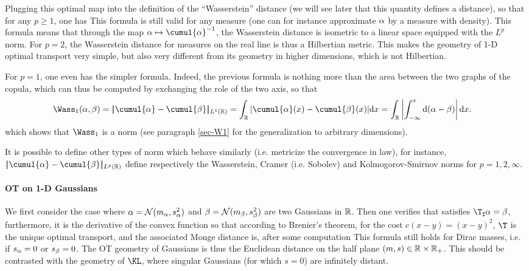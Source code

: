 Plugging this optimal map into the definition of the ``Wasserstein'' distance (we will see later that this quantity defines a distance), so that for any $p \geq 1$, one has
This formula is still valid for any measure (one can for instance approximate $\alpha$ by a measure with density). 
%
This formula means that through the map $\al \mapsto \cumul{\al}^{-1}$, the Wasserstein distance is isometric to a linear space equipped with the $L^p$ norm. For $p=2$, the Wasserstein distance for measures on the real line is thus a Hilbertian metric. 
This makes the geometry of 1-D optimal transport very simple, but also very different from its geometry in higher dimensions, which is not Hilbertian.

For $p=1$, one even has the simpler formula. Indeed, the previous formula is nothing more than the area between the two graphs of the copula, which can thus be computed by exchanging the role of the two axis, so that 
\begin{align}\label{eq-w1-1d}
	\Wass_1(\al,\be) &= \norm{ \cumul{\al} - \cumul{\be} }_{L^1(\RR)} = 
	\int_\RR | \cumul{\al}(x) - \cumul{\be}(x) | \d x 
	= \int_\RR \abs{ \int_{-\infty}^x \d(\al-\be) } \d x.
\end{align}
which shows that $\Wass_1$ is a norm (see paragraph \ref{sec-W1} for the generalization to arbitrary dimensions). 

It is possible to define other types of norm which behave similarly (i.e. metricize the convergence in law), for instance, $\norm{ \cumul{\al} - \cumul{\be} }_{L^p(\RR)}$ define respectively the Wasserstein, Cramer (i.e. Sobolev) and Kolmogorov-Smirnov norms for $p=1,2,\infty$. 




\paragraph{OT on 1-D Gaussians}

We first consider the case where $\alpha = \mathcal{N}(m_\alpha,s_\alpha^2)$ and $\beta = \mathcal{N}(m_\beta,s_\beta^2)$ are two Gaussians in $\mathbb{R}$. 
%
Then one verifies that 
satisfies $\T_\sharp \al=\be$, furthermore, it is the derivative of the convex function 
so that according to Brenier's theorem, for the cost $c(x-y)=(x-y)^2$, $\T$ is the unique optimal transport, and the associated Monge distance is, after some computation
This formula still holds for Dirac masses, i.e. if $s_\alpha=0$ or $s_\beta=0$.
%
The OT geometry of Gaussians is thus the Euclidean distance on the half plane $(m,s) \in \mathbb{R} \times \mathbb{R}_+$.
%
This should be contrasted with the geometry of $\KL$, where singular Gaussians (for which $s=0$) are infinitely distant. 

